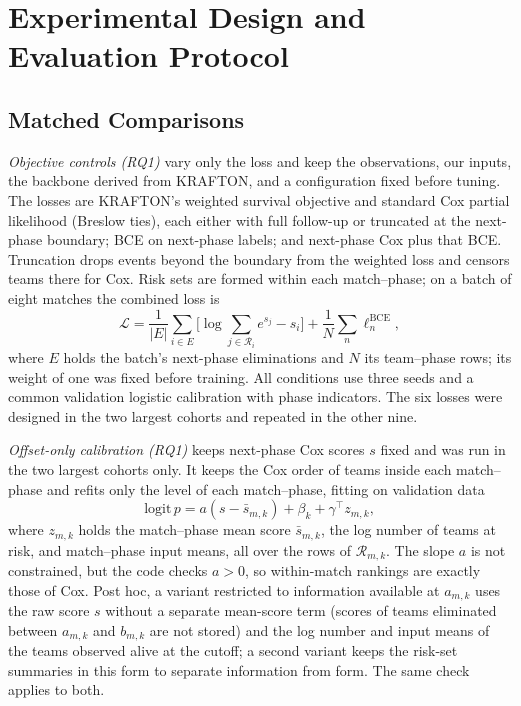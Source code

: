 \documentclass[sigconf,anonymous]{acmart}
\begin{document}
\section{Experimental Design and Evaluation Protocol}
\label{sec:method:evaluation}
\subsection{Matched Comparisons}
\label{sec:method:decomposition}
\emph{Objective controls (RQ1)} vary only the loss and keep the observations, our inputs, the backbone derived from KRAFTON, and a configuration fixed before tuning. The losses are KRAFTON's weighted survival objective and standard Cox partial likelihood (Breslow ties), each either with full follow-up or truncated at the next-phase boundary; BCE on next-phase labels; and next-phase Cox plus that BCE. Truncation drops events beyond the boundary from the weighted loss and censors teams there for Cox. Risk sets are formed within each match--phase; on a batch of eight matches the combined loss is
\begin{equation}
\mathcal{L}=\frac{1}{|E|}\sum_{i\in E}\Big[\log\sum_{j\in\mathcal{R}_i}e^{s_j}-s_i\Big]+\frac{1}{N}\sum_{n}\ell^{\mathrm{BCE}}_n,
\label{eq:combined}
\end{equation}
where $E$ holds the batch's next-phase eliminations and $N$ its team--phase rows; its weight of one was fixed before training. All conditions use three seeds and a common validation logistic calibration with phase indicators. The six losses were designed in the two largest cohorts and repeated in the other nine.

\emph{Offset-only calibration (RQ1)} keeps next-phase Cox scores $s$ fixed and was run in the two largest cohorts only. It keeps the Cox order of teams inside each match--phase and refits only the level of each match--phase, fitting on validation data
\begin{equation}
\mathrm{logit}\,p=a(s-\bar s_{m,k})+\beta_k+\gamma^{\top}z_{m,k},
\label{eq:offset}
\end{equation}
where $z_{m,k}$ holds the match--phase mean score $\bar s_{m,k}$, the log number of teams at risk, and match--phase input means, all over the rows of $\mathcal{R}_{m,k}$. The slope $a$ is not constrained, but the code checks $a>0$, so within-match rankings are exactly those of Cox. Post hoc, a variant restricted to information available at $a_{m,k}$ uses the raw score $s$ without a separate mean-score term (scores of teams eliminated between $a_{m,k}$ and $b_{m,k}$ are not stored) and the log number and input means of the teams observed alive at the cutoff; a second variant keeps the risk-set summaries in this form to separate information from form. The same check applies to both.
\end{document}
